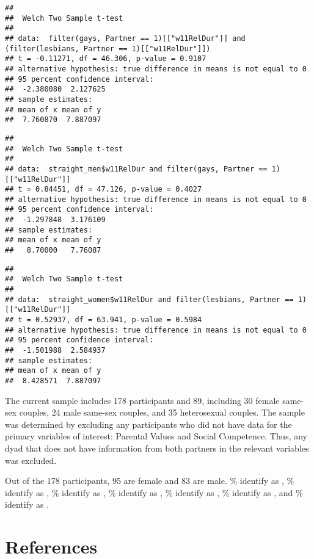 \documentclass[man]{apa6}
\begin{document}
\begin{verbatim}
## 
##  Welch Two Sample t-test
## 
## data:  filter(gays, Partner == 1)[["w11RelDur"]] and (filter(lesbians, Partner == 1)[["w11RelDur"]])
## t = -0.11271, df = 46.306, p-value = 0.9107
## alternative hypothesis: true difference in means is not equal to 0
## 95 percent confidence interval:
##  -2.380080  2.127625
## sample estimates:
## mean of x mean of y 
##  7.760870  7.887097
\end{verbatim}

\begin{verbatim}
## 
##  Welch Two Sample t-test
## 
## data:  straight_men$w11RelDur and filter(gays, Partner == 1)[["w11RelDur"]]
## t = 0.84451, df = 47.126, p-value = 0.4027
## alternative hypothesis: true difference in means is not equal to 0
## 95 percent confidence interval:
##  -1.297848  3.176109
## sample estimates:
## mean of x mean of y 
##   8.70000   7.76087
\end{verbatim}

\begin{verbatim}
## 
##  Welch Two Sample t-test
## 
## data:  straight_women$w11RelDur and filter(lesbians, Partner == 1)[["w11RelDur"]]
## t = 0.52937, df = 63.941, p-value = 0.5984
## alternative hypothesis: true difference in means is not equal to 0
## 95 percent confidence interval:
##  -1.501988  2.584937
## sample estimates:
## mean of x mean of y 
##  8.428571  7.887097
\end{verbatim}

The current sample includes 178 participants and 89, including 30 female same-sex couples, 24 male same-sex couples, and 35 heterosexual couples. The sample was determined by excluding any participants who did not have data for the primary variables of interest: Parental Values and Social Competence. Thus, any dyad that does not have information from both partners in the relevant variables was excluded.

Out of the 178 participants, 95 are female and 83 are male. \% identify as , \% identify as , \% identify as , \% identify as , \% identify as , \% identify as , and \% identify as .

\newpage

\hypertarget{references}{%
\section{References}\label{references}}

\begingroup
\setlength{\parindent}{-0.5in}
\setlength{\leftskip}{0.5in}

\hypertarget{refs}{}

\endgroup
\end{document}
